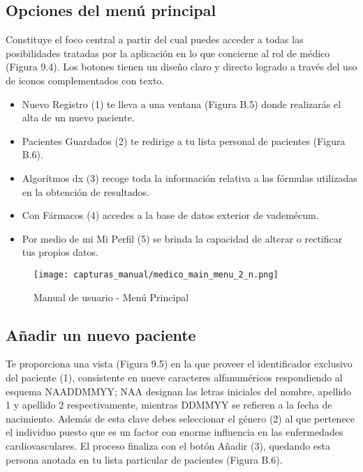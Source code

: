 \documentclass[11pt,spanish,
		listoftables,listoffigures]
		{tfgplantilla}
\begin{document}
\subsection {Opciones del menú principal}
Constituye el foco central a partir del cual puedes acceder a todas las posibilidades tratadas por la aplicación en lo que concierne al rol de médico (Figura 9.4). Los botones tienen un diseño claro y directo logrado a través del uso de iconos complementados con texto. 

\begin{itemize}
	\item \textquotedbl Nuevo Registro\textquotedbl{} (1) te lleva a una ventana (Figura B.5) donde realizarás el alta de un nuevo paciente.

	\item \textquotedbl Pacientes Guardados\textquotedbl{} (2) te redirige a tu lista personal de pacientes (Figura B.6).

	\item \textquotedbl Algor\'itmos dx\textquotedbl{} (3) recoge toda la información relativa a las fórmulas utilizadas en la obtención de resultados.

	\item Con \textquotedbl Fármacos\textquotedbl{} (4) accedes a la base de datos exterior de vademécum.

	\item Por medio de mi \textquotedbl Mi Perfil\textquotedbl{} (5) se brinda la capacidad de alterar o rectificar tus propios datos.
\end{itemize}

\begin{figure}[H]
\centering
\texttt{[image: capturas\_manual/medico\_main\_menu\_2\_n.png]}
\caption{Manual de usuario - Menú Principal}
\end{figure}

\subsection {Añadir un nuevo paciente}

Te proporciona una vista (Figura 9.5) en la que proveer el identificador exclusivo del paciente (1), consistente en nueve caracteres alfanuméricos respondiendo al esquema NAADDMMYY; NAA designan las letras iniciales del nombre, apellido 1 y apellido 2 respectivamente, mientras DDMMYY se refieren a la fecha de nacimiento. Además de esta clave debes seleccionar el género (2) al que pertenece el individuo puesto que es un factor con enorme influencia en las enfermedades cardiovasculares. El proceso finaliza con el botón \textquotedbl Añadir\textquotedbl{} (3), quedando esta persona anotada en tu lista particular de pacientes (Figura B.6).
\end{document}
